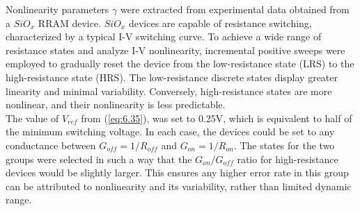 
\noindent Nonlinearity parameters $\gamma$ were extracted from experimental data obtained from a $SiO_x$  RRAM device. $SiO_x$ devices are capable of resistance switching, characterized by a typical I-V switching curve. To achieve a wide range of resistance states and analyze I-V nonlinearity, incremental positive sweeps were employed to gradually reset the device from the low-resistance state (LRS) to the high-resistance state (HRS). The low-resistance discrete states display greater linearity and minimal variability. Conversely, high-resistance states are more nonlinear, and their nonlinearity is less predictable.\\

\noindent The value of $V_{ref}$ from (\ref{eq:6.35}), was set to 0.25V, which is equivalent to half of the minimum switching voltage. In each case, the devices could be set to any conductance between $G_{off} = 1/R_{off}$ and $G_{on} = 1/R_{on}$. The states for the two groups were selected in such a way that the $G_{on}/G_{off}$ ratio for high-resistance devices would be slightly larger. This ensures any higher error rate in this group can be attributed to nonlinearity and its variability, rather than limited dynamic range.\\


